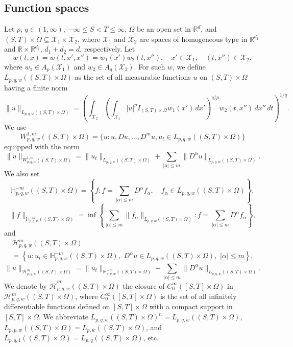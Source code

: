 \documentclass[reqno]{amsart}
\numberwithin{equation}{section}
\theoremstyle{plain}
\theoremstyle{definition}
\theoremstyle{remark}
\begin{document}
\subsection{Function spaces}

Let $p,\,q\in (1,\infty)$, $-\infty\le S<T\le \infty$, $\Omega$ be an open set in ${\mathbb{R}}^d$, and $(S,T)\times \Omega\subseteq {\mathcal{X}}_1\times {\mathcal{X}}_2$, where 
 ${\mathcal{X}}_1$ and ${\mathcal{X}}_2$ are  spaces of homogeneous type in  ${\mathbb{R}}^{d_1}$ and ${\mathbb{R}}\times {\mathbb{R}}^{d_2}$, $d_1+d_2=d$, respectively.
Let 
\[
w(t,x)=w(t,x',x'')=w_1(x')w_2(t,x''), \quad x'\in {\mathcal{X}}_1, \quad (t,x'')\in {\mathcal{X}}_2,
\]
where $w_1\in A_p({\mathcal{X}}_1)$ and $w_2\in A_q({\mathcal{X}}_2)$.
For such $w$, we define $L_{p,q,w}((S,T)\times \Omega)$ as the set of all measurable functions $u$ on $(S,T)\times \Omega$ having a finite norm
\[
\|u\|_{L_{p,q,w}((S,T)\times \Omega)}=\left(\int_{{\mathcal{X}}_2}\left(\int_{{\mathcal{X}}_1} |u|^pI_{(S,T)\times \Omega} w_1(x')\,dx'\right)^{q/p}w_2(t,x'')\,dx''\,dt\right)^{1/q}.
\]
We use 
\[
W^{1,m}_{p,q,w}((S,T)\times \Omega)=\{ u: u, Du, \ldots, D^m u, u_t\in L_{p,q,w}((S,T)\times \Omega)\}
\]
equipped with the norm
\[
\|u\|_{W^{1,m}_{p,q,w}((S,T)\times \Omega)}=\|u_t\|_{L_{p,q,w}((S,T)\times \Omega)}+\sum_{|\alpha| \le m}\|D^\alpha u\|_{L_{p,q,w}((S,T)\times \Omega)}.
\]
We also set 
\[
{\mathbb{H}}^{-m}_{p,q,w}((S,T)\times \Omega)=\left\{f:f=\sum_{|\alpha| \le m}D^\alpha f_\alpha, \quad f_\alpha \in L_{p,q,w}((S,T)\times \Omega)\right\},
\]
\[
\|f\|_{{\mathbb{H}}^{-m}_{p,q,w}((S,T)\times \Omega)}=\inf\left\{\sum_{|\alpha| \le m}\|f_\alpha\|_{L_{p,q,w}((S,T)\times \Omega)}: f=\sum_{|\alpha| \le m}D^\alpha f_\alpha \right\},
\]
and 
\begin{multline*}
{\mathcal{H}}^m_{p,q,w}((S,T)\times \Omega)\\
=\left\{ u: u_t\in {\mathbb{H}}^{-m}_{p,q,w}((S,T)\times \Omega), \,\, D^\alpha u\in L_{p,q,w}((S,T)\times \Omega), \,\, |\alpha| \le m\right\},
\end{multline*}
\[
\|u\|_{{\mathcal{H}}^m_{p,q,w}((S,T)\times \Omega)}=\|u_t\|_{{\mathbb{H}}^{-m}_{p,q,w}((S,T)\times \Omega)}+\sum_{|\alpha| \le m}\|D^\alpha u\|_{L_{p,q,w}((S,T)\times \Omega)}.
\]
We denote by $\mathring{\mathcal{H}}^m_{p,q,w}((S,T)\times \Omega)$ the closure of $C^\infty_0([S,T]\times \Omega)$ in ${\mathcal{H}}^m_{p,q,w}((S,T)\times \Omega)$, where $C^\infty_0([S,T]\times \Omega)$ is the set of all infinitely differentiable functions defined on $[S,T]\times \Omega$ with a compact support in $[S,T]\times \Omega$.
We abbreviate $L_{p,q,w}((S,T)\times \Omega)^n=L_{p,q,w}((S,T)\times \Omega)$, $L_{p,p,w}((S,T)\times \Omega)=L_{p,w}((S,T)\times \Omega)$, and $L_{p,q,1}((S,T)\times \Omega)=L_{p,q}((S,T)\times \Omega)$, etc.
\end{document}
